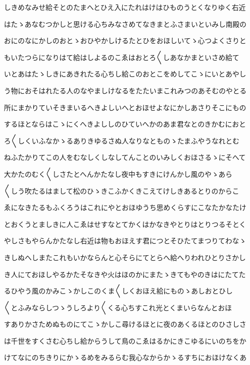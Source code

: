 \documentclass[a4paper,11pt,landscape]{ltjtarticle}
\begin{document}
しきめなみせ給そとのたまへとひえ入にたれはけはひものうとくなりゆく右近
\par\medskip
はたゝあなむつかしと思ける心ちみなさめてなきまとふさまいといみし南殿の
\par\medskip
おにのなにかしのおとゝおひやかしけるたとひをおほしいてゝ心つよくさりと
\par\medskip
もいたつらになりはて給はしよるのこゑはおとろ〱しあなかまといさめ給て
\par\medskip
いとあはたゝしきにあきれたる心ちし給このおとこをめしてこゝにいとあやし
\par\medskip
う物におそはれたる人のなやましけなるをたたいまこれみつのあそむのやとる
\par\medskip
所にまかりていそきまいるへきよしいへとおほせよなにかしあさりそこにもの
\par\medskip
するほとならはこゝにくへきよししのひていへかのあま君なとのきかむにおと
\par\medskip
ろ〱しくいふなかゝるありきゆるさぬ人なりなとものゝたまふやうなれとむ
\par\medskip
ねふたかりてこの人をむなしくしなしてんことのいみしくおほさるゝにそへて
\par\medskip
大かたのむく〱しさたとへんかたなし夜中もすきにけんかし風のやゝあら
\par\medskip
〱しう吹たるはまして松のひゝきこふかくきこえてけしきあるとりのからこ
\par\medskip
ゑになきたるもふくろうはこれにやとおほゆうち思めくらすにこなたかなたけ
\par\medskip
とおくうとましきに人こゑはせすなとてかくはかなきやとりはとりつるそとく
\par\medskip
やしさもやらんかたなし右近は物もおほえす君につとそひたてまつりてわなゝ
\par\medskip
きしぬへしまたこれもいかならんと心そらにてとらへ給へりわれひとりさかし
\par\medskip
き人にておほしやるかたそなきや火はほのかにまたゝきてもやのきはにたてた
\par\medskip
るひやう風のかみこゝかしこのくま〱しくおほえ給にものゝあしおとひし
\par\medskip
〱とふみならしつゝうしろより〱くる心ちすこれ光とくまいらなんとおほ
\par\medskip
すありかさためぬものにてこゝかしこ尋けるほとに夜のあくるほとのひさしさ
\par\medskip
は千世をすくさむ心ちし給からうして鳥のこゑはるかにきこゆるにいのちをか
\par\medskip
けてなにのちきりにかゝるめをみるらむ我心なからかゝるすちにおほけなくあ
\end{document}
